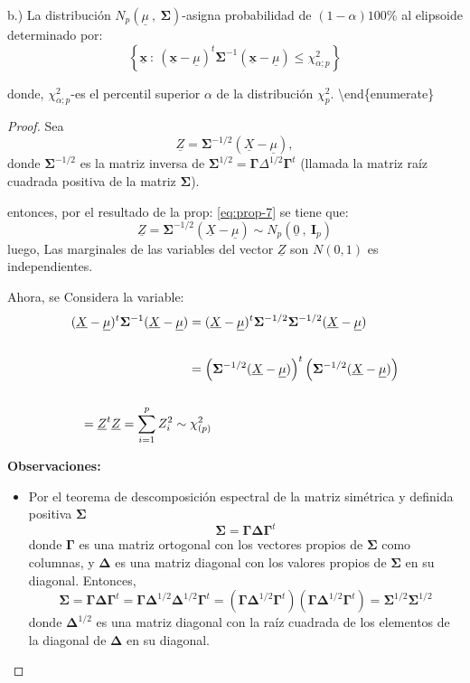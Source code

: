 \documentclass[
]{book}
\providecommand{\tightlist}{%
  \setlength{\itemsep}{0pt}\setlength{\parskip}{0pt}}
\theoremstyle{definition}
\theoremstyle{definition}
\theoremstyle{definition}
\theoremstyle{definition}
\theoremstyle{remark}
\begin{document}
b.) La distribución \(N_p(\underline{\mu}\ , \ \mathbf{\Sigma})\)-asigna probabilidad de \((1-\alpha)100\%\) al elipsoide determinado por:
\begin{equation}
\left\{\underline{\mathbf{x}}\ : \  (\underline{\mathbf{x}} -\underline{\mu})^t\mathbf{\Sigma}^{-1}(\underline{\mathbf{x}} -\underline{\mu}) \leq \chi_{\alpha;p}^2 \right\}
\label{eq:prop-8b}
\end{equation}

donde, \(\chi_{\alpha;p}^2\)-es el percentil superior \(\alpha\) de la distribución \(\chi_p^2\).
\textbackslash end\{enumerate\}

\begin{proof}
Sea
\[
\underline{Z}= \mathbf{\Sigma}^{-1/2} (\underline{X} -\underline{\mu} ),
\]
donde \(\mathbf{\Sigma}^{-1/2}\) es la matriz inversa de \(\mathbf{\Sigma}^{1/2}=\mathbf{\Gamma} \Delta^{1/2}\mathbf{ \Gamma}^{t}\) (llamada la
matriz raíz cuadrada positiva de la matriz \(\mathbf{\Sigma}\)).

entonces, por el resultado de la prop: \eqref{eq:prop-7} se tiene que:
\[
\underline{Z}= \mathbf{\Sigma}^{-1/2} (\underline{X} -\underline{\mu} ) \sim N_p (\underline{0}\ , \ \mathbf{I}_p) 
\]
luego, Las marginales de las variables del vector \(\underline{Z}\) son \(N(0, 1)\) es independientes.

Ahora, se Considera la variable:
\begin{align*}
(\underline{X}-\underline{\mu})^t\mathbf{\Sigma}^{-1}(\underline{X}-\underline{\mu})&=(\underline{X}-\underline{\mu})^t\mathbf{\Sigma}^{-1/2}\mathbf{\Sigma}^{-1/2}(\underline{X}-\underline{\mu}) \\ \\
&=\left(\mathbf{\Sigma}^{-1/2} (\underline{X} -\underline{\mu} ) \right)^t \left(\mathbf{\Sigma}^{-1/2} (\underline{X} -\underline{\mu} ) \right) \\ \\ 
&\hspace{-3.0cm}=\underline{Z}^t\underline{Z} = \sum_{i=1}^p Z_i^2 \sim \chi_{(p)}^2
\end{align*}

\textbf{Observaciones:}

\begin{itemize}
\tightlist
\item
  Por el teorema de descomposición espectral de la
  matriz simétrica y definida positiva \(\mathbf{\Sigma}\)
  \[
  \mathbf{\Sigma}= \mathbf{\Gamma} \mathbf{\Delta} \mathbf{\Gamma}^t
  \]
  donde \(\mathbf{\Gamma}\) es una
  matriz ortogonal con los vectores propios de \(\mathbf{\Sigma}\) como columnas, y \(\mathbf{\Delta}\) es una matriz diagonal con los valores propios de \(\mathbf{\Sigma}\) en su diagonal. Entonces,
  \[
  \mathbf{\Sigma}= \mathbf{\Gamma} \mathbf{\Delta} \mathbf{\Gamma}^t=\mathbf{\Gamma} \mathbf{\Delta}^{1/2}\mathbf{\Delta}^{1/2} \mathbf{\Gamma}^t=(\mathbf{\Gamma} \mathbf{\Delta}^{1/2}\mathbf{\Gamma}^t)(\mathbf{\Gamma}  \mathbf{\Delta}^{1/2} \mathbf{\Gamma}^t)=\mathbf{\Sigma}^{1/2}\mathbf{\Sigma}^{1/2}
  \]
  donde \(\mathbf{\Delta}^{1/2}\) es una matriz diagonal con la raíz cuadrada de los elementos de la diagonal de \(\mathbf{\Delta}\) en su diagonal.
\end{itemize}


\end{proof}
\end{document}
